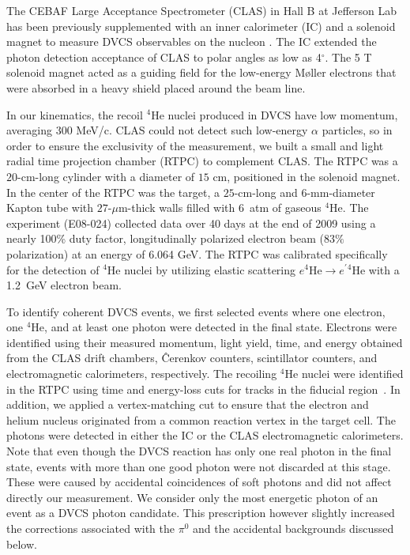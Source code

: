 \documentclass[twocolumn,nofootinbib,showpacs,prl,superscriptaddress,secnumarabic,amssymb,nobibnotes,aps,floatfix]{revtex4}
\begin{document}
The CEBAF Large Acceptance Spectrometer (CLAS) in Hall B at Jefferson Lab has been
previously supplemented with an inner calorimeter (IC) and a solenoid magnet to
measure DVCS observables on the nucleon
\cite{Girod:2007aa,Gavalian:2009,Seder:2015,Pisano:2015,Jo:2015ema}. The IC 
extended the photon detection acceptance of CLAS to polar angles as low as 
4$^{\circ}$. The 5 T solenoid magnet acted as a guiding field for the 
low-energy M\o{}ller electrons that were absorbed in a  
heavy shield placed around the beam line. 

In our kinematics, the recoil $^4$He nuclei produced in DVCS have low momentum,
averaging 300 MeV/c. CLAS could not detect such low-energy $\alpha$ 
particles, so in order to ensure the exclusivity of the measurement, we built a 
small and light radial time projection chamber (RTPC) to complement CLAS. The 
RTPC was a $20$-cm-long cylinder with a diameter of $15$ cm, positioned in the 
solenoid magnet. In the center of the RTPC was the target, a $25$-cm-long 
and $6$-mm-diameter Kapton tube with $27$-$\mu$m-thick walls filled with 
6~atm of gaseous $^4$He. The experiment (E08-024) collected
data over 40 days at the end of 2009 using a 
nearly 100\% duty factor, longitudinally polarized electron beam (83$\%$ 
polarization) at an energy of 6.064 GeV. The RTPC was calibrated specifically 
for the detection of $^4$He nuclei by utilizing elastic scattering 
$e^4$He$\to e^\prime$$^4$He with a 1.2~GeV electron beam.

To identify coherent DVCS events, we first selected events where one electron, 
one $^4$He, and at least one photon were detected in the final state. Electrons 
were identified using their measured momentum, light yield, time, and energy obtained from 
the CLAS drift chambers, \^{C}erenkov counters, scintillator counters, 
and electromagnetic calorimeters, respectively. The recoiling $^4$He nuclei 
were identified in the RTPC using time and energy-loss cuts for tracks in the 
fiducial region~\cite{Hattawy:thesis}. In addition, we applied a vertex-matching 
cut to ensure that the 
electron and helium nucleus originated from a common reaction vertex in the 
target cell. The photons were 
detected in either the IC or the CLAS electromagnetic calorimeters. Note that 
even though the DVCS reaction has only one real photon in the final state, 
events with more than one good photon were not discarded at this stage. These
were caused by accidental coincidences of soft photons and did not affect 
directly our measurement. We consider only the most energetic photon of an 
event as a DVCS photon candidate.
This prescription however slightly increased the corrections associated with
the $\pi^0$ and the accidental backgrounds discussed below. 
\end{document}

